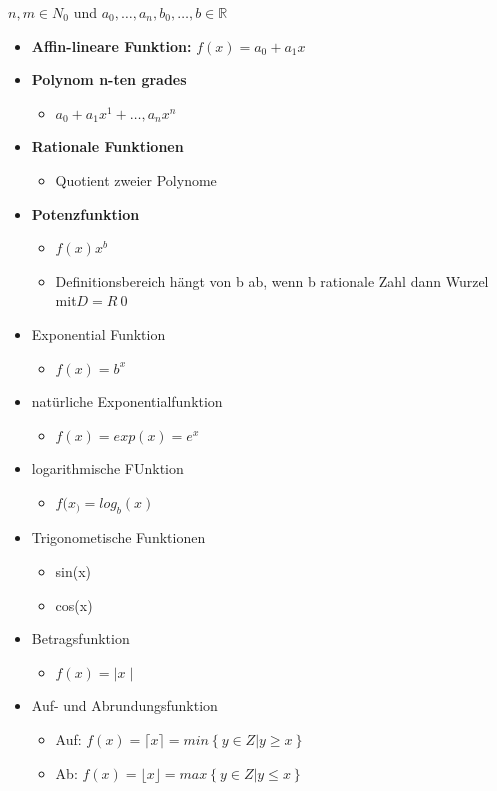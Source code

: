 \begin{definition}
    $n,m \in N_0$ und $a_0, \dots, a_n, b_0,\dots,b \in \mathbb{R}$
\begin{itemize}
    \item\textbf{ Affin-lineare Funktion:} $f(x) = a_0 + a_1x $
    \item \textbf{Polynom n-ten grades}
    \begin{itemize}
        \item $a_0 + a_1x^1 + \dots, a_nx^n$
    \end{itemize}
    \item \textbf{Rationale Funktionen}
    \begin{itemize}
        \item Quotient zweier Polynome
    \end{itemize}
    \item \textbf{Potenzfunktion}
    \begin{itemize}
        \item $f(x)  x^b $
        \item Definitionsbereich hängt von b ab, wenn b rationale Zahl dann Wurzel mit$ D = R \ {0}$
    \end{itemize}
    \item Exponential Funktion
    \begin{itemize}
        \item $f(x) =b^x$
    \end{itemize}
    \item natürliche Exponentialfunktion
    \begin{itemize}
        \item $f(x) = exp(x) = \textit{e}^x$
    \end{itemize}
    \item logarithmische FUnktion\begin{itemize}
        \item $f(x_) = log_b(x)$
    \end{itemize}
    \item Trigonometische Funktionen
    \begin{itemize}
        \item sin(x)
        \item cos(x)
    \end{itemize}
    \item Betragsfunktion
    \begin{itemize}
        \item $f(x) = \mid x \mid  $
    \end{itemize}
    \item Auf- und Abrundungsfunktion
    \begin{itemize}
        \item Auf: $f(x) = \lceil x \rceil = min\left\{y \in Z | y \ge x\right\}$
        \item Ab:  $f(x) = \lfloor x \rfloor = max\left\{y \in Z | y \le x\right\}$
    \end{itemize}
\end{itemize}        
\end{definition}

